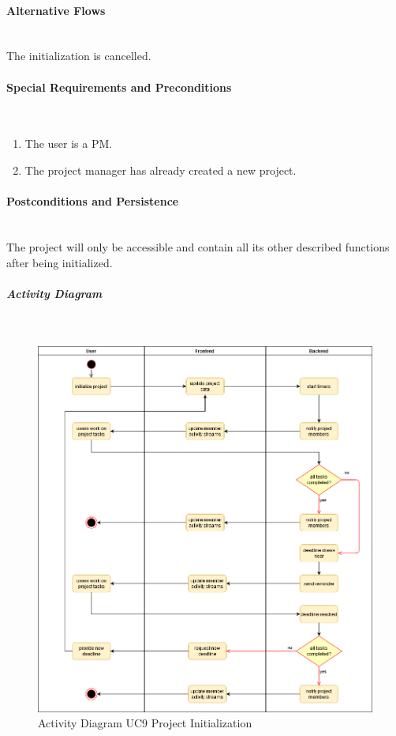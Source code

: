 \paragraph*{Alternative Flows}\mbox{}\\
The initialization is cancelled.

\paragraph*{Special Requirements and Preconditions}\mbox{}\\
\begin{enumerate}
	\vspace{-3mm}
	\setlength\itemsep{-1em}
	\item The user is a PM.
	\item The project manager has already created a new project.
\end{enumerate}

\paragraph*{Postconditions and Persistence}\mbox{}\\
The project will only be accessible and contain all its other described functions after being initialized.

\newpage
\subparagraph{Activity Diagram}\mbox{}\\
\begin{figure}[H]
	\centering
	\includegraphics[width=1.0\textwidth]{Content/Domain/UC9Initialization.png}
	\caption{Activity Diagram  \ac{UC}9 Project Initialization}
	\label{fig:label14}
\end{figure}



